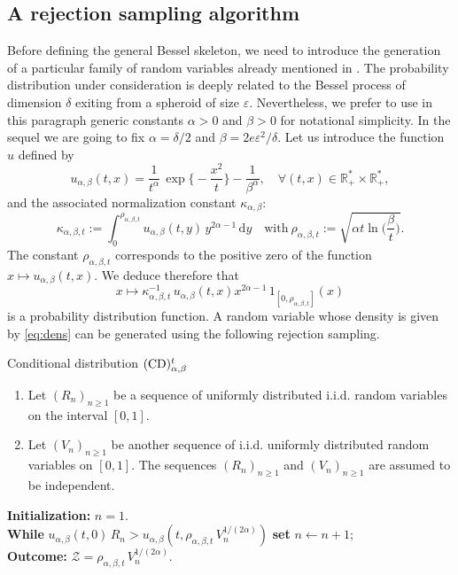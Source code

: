 \documentclass[12pt]{article}
\newcommand{\dint}{\mathrm{d}}
\numberwithin{equation}{section}
\begin{document}
\subsection*{A rejection sampling algorithm}
Before defining the general Bessel skeleton, we need to introduce the generation of a particular family of random variables already mentioned in \cite{Deaconu-Herrmann-2017}. The probability distribution under consideration is deeply related to the Bessel process of dimension $\delta$ exiting from a spheroid of size $\varepsilon$. Nevertheless, we prefer to use in this paragraph generic constants $\alpha>0$ and $\beta>0$ for notational simplicity. In the sequel we are going to fix $\alpha=\delta/2$ and $\beta=2e\varepsilon^2/\delta$. Let us introduce the function $u$ defined by
\begin{equation}
\label{eq:defdeu}
u_{\alpha,\beta}(t,x)= \frac{1}{t^\alpha}\,\exp\Big\{-\frac{x^2}{t}\Big\}-\frac{1}{\beta^\alpha} %
,\quad \forall(t,x)\in\mathbb{R}_+^*\times \mathbb{R}_+^*,
\end{equation}
and the associated normalization constant $\kappa_{\alpha,\beta}$:
\begin{equation}
\label{eq:defconst}
\kappa_{\alpha,\beta,t}:=\int_0^{\rho_{\alpha,\beta,t}}u_{\alpha,\beta}(t,y)\,y^{2\alpha-1}\,\dint y\quad\mbox{with}\ \rho_{\alpha,\beta,t}:=\sqrt{\alpha t \ln\Big(\frac{\beta}{t}\Big)}.
\end{equation}
The constant $\rho_{\alpha,\beta,t}$ corresponds to the positive zero of the function $x\mapsto u_{\alpha,\beta}(t,x)$. We deduce therefore that 
\begin{equation}
x\mapsto \kappa^{-1}_{\alpha,\beta,t}\,u_{\alpha,\beta}(t,x)x^{2\alpha-1}\,1_{[0,\rho_{\alpha,\beta,t}]}(x)
\label{eq:dens}
\end{equation}
is a probability distribution function. A random variable whose density is given by \eqref{eq:dens} can be generated using the following rejection sampling. 
\begin{framed}
\centerline{\sc Conditional distribution $({\rm CD})_{\alpha,\beta}^t$}

\vspace*{0.2cm}
\begin{enumerate}
\item Let $(R_n)_{n\ge 1}$  be a sequence of uniformly distributed i.i.d. random variables on the interval $[0,1]$. 
\item Let $(V_n)_{n\ge 1}$ be another sequence of i.i.d. uniformly distributed random variables on $[0,1]$. The sequences 
 $(R_n)_{n\ge 1}$ and $(V_n)_{n\ge 1}$ are assumed to be independent. 
\end{enumerate}
{\bf Initialization:} $n=1$.\\[5pt]
{\bf While} \( u_{\alpha,\beta}(t,0)\, R_n> u_{\alpha,\beta}(t,\rho_{\alpha,\beta,t}\,V_n^{1/(2\alpha)})\) {\bf set} $n\leftarrow n+1$;\\[5pt]
{\bf Outcome:} $\mathcal{Z}=\rho_{\alpha,\beta,t}\,V_n^{1/(2\alpha)}$.
\end{framed}
\end{document}
